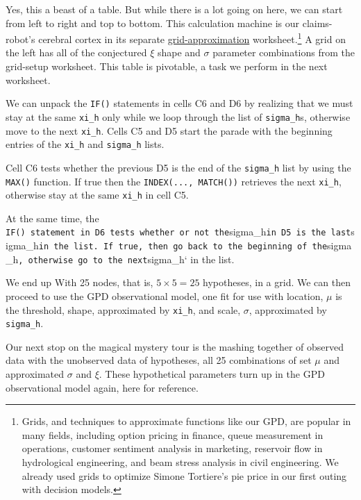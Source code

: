 \documentclass[
]{book}
\begin{document}
Yes, this a beast of a table. But while there is a lot going on here, we can start from left to right and top to bottom. This calculation machine is our claims-robot's cerebral cortex in its separate \href{https://journals.plos.org/ploscompbiol/article?id=10.1371/journal.pcbi.1002803}{grid-approximation} worksheet.\footnote{Grids, and techniques to approximate functions like our GPD, are popular in many fields, including option pricing in finance, queue measurement in operations, customer sentiment analysis in marketing, reservoir flow in hydrological engineering, and beam stress analysis in civil engineering. We already used grids to optimize Simone Tortiere's pie price in our first outing with decision models.} A grid on the left has all of the conjectured \(\xi\) shape and \(\sigma\) parameter combinations from the grid-setup worksheet. This table is pivotable, a task we perform in the next worksheet.

We can unpack the \texttt{IF()} statements in cells C6 and D6 by realizing that we must stay at the same \texttt{xi\_h} only while we loop through the list of \texttt{sigma\_h}s, otherwise move to the next \texttt{xi\_h}. Cells C5 and D5 start the parade with the beginning entries of the \texttt{xi\_h} and \texttt{sigma\_h} lists.

Cell C6 tests whether the previous D5 is the end of the \texttt{sigma\_h} list by using the \texttt{MAX()} function. If true then the \texttt{INDEX(...,\ MATCH())} retrieves the next \texttt{xi\_h}, otherwise stay at the same \texttt{xi\_h} in cell C5.

At the same time, the \texttt{IF()\ statement\ in\ D6\ tests\ whether\ or\ not\ the}sigma\_h\texttt{in\ D5\ is\ the\ last}sigma\_h\texttt{in\ the\ list.\ If\ true,\ then\ go\ back\ to\ the\ beginning\ of\ the}sigma\_h\texttt{,\ otherwise\ go\ to\ the\ next}sigma\_h` in the list.

We end up With 25 nodes, that is, \(5 \times 5 = 25\) hypotheses, in a grid. We can then proceed to use the GPD observational model, one fit for use with location, \(\mu\) is the threshold, shape, approximated by \texttt{xi\_h}, and scale, \(\sigma\), approximated by \texttt{sigma\_h}.

Our next stop on the magical mystery tour is the mashing together of observed data with the unobserved data of hypotheses, all 25 combinations of set \(\mu\) and approximated \(\sigma\) and \(\xi\). These hypothetical parameters turn up in the GPD observational model again, here for reference.
\end{document}
